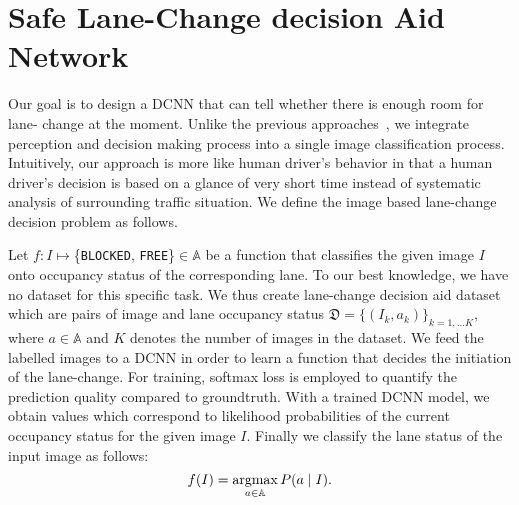 \documentclass[letterpaper, 10pt, conference]{ieeeconf}
\newcommand{\B}{{\tt BLOCKED}}
\newcommand{\F}{{\tt FREE}}
\newcommand{\argmax}{\operatornamewithlimits{argmax}}
\begin{document}
\section{Safe Lane-Change decision Aid Network}
\label{sec:slcan}

	Our goal is to design a DCNN that can tell whether there is enough room for lane-%
change at the moment.  Unlike the previous approaches~\cite{schubert2010,Pellkofer2002,Schlechtrienmen2014,Damerow16,Kesting99}, 
we integrate perception and decision making process into a single image classification 
process. Intuitively, our approach is more like human driver's behavior in that a human
driver's decision is based on a glance of very short time instead of systematic analysis
of surrounding traffic situation.  We define the image based lane-change decision problem
as follows.
	
	Let $f:I\mapsto$\{\B, \F\}$\in\mathbb{A}$ be a function that classifies the given
image $I$ onto occupancy status of the corresponding lane. To our best knowledge, we
have no dataset for this specific task. We thus create lane-change decision aid
dataset which are pairs of image and lane occupancy status $\mathfrak{D}=\{(I_k,
a_k)\}_{k=1,\dots K}$, where $a\in\mathbb{A}$ and $K$ denotes the number of images in the dataset. We feed the labelled images to a DCNN in order to learn a function that
decides the initiation of the lane-change. For training, softmax loss is employed to
quantify the prediction quality compared to groundtruth. With a trained DCNN model, we
obtain values which correspond to likelihood probabilities of the current occupancy
status for the given image $I$. Finally we classify the lane status of the input image
as follows:
	\[
		f(I) = \argmax_{a\in\mathbb{A}}P(a\mid I).
	\]	
\end{document}
